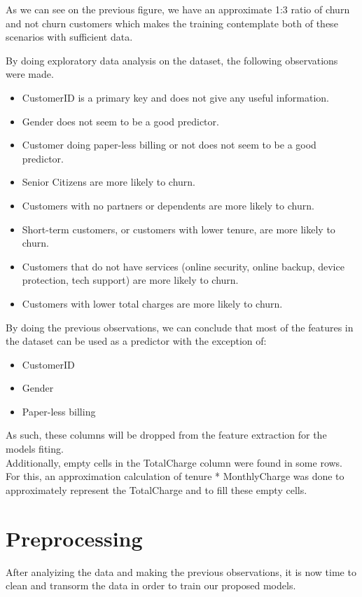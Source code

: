 \documentclass[letterpaper, 10 pt, conference]{ieeeconf}
\begin{document}
As we can see on the previous figure, we have an approximate 1:3 ratio of churn and not churn customers which makes the training
contemplate both of these scenarios with sufficient data.

By doing exploratory data analysis on the dataset, the following observations were made.
\begin{itemize}
    \item CustomerID is a primary key and does not give any useful information.
    \item Gender does not seem to be a good predictor.
    \item Customer doing paper-less billing or not does not seem to be a good predictor.
    \item Senior Citizens are more likely to churn.
    \item Customers with no partners or dependents are more likely to churn.
    \item Short-term customers, or customers with lower tenure, are more likely to churn.
    \item Customers that do not have services (online security, online backup, device protection, tech support) are more likely to churn.
    \item Customers with lower total charges are more likely to churn.
\end{itemize}
By doing the previous observations, we can conclude that most of the features in the dataset can be used as a predictor with the exception of:
\begin{itemize}
    \item CustomerID
    \item Gender
    \item Paper-less billing
\end{itemize}

As such, these columns will be dropped from the feature extraction for the models fiting. \\

Additionally, empty cells in the TotalCharge column were found in some rows. For this, an approximation calculation of tenure * MonthlyCharge was done
to approximately represent the TotalCharge and to fill these empty cells.

\section{ Preprocessing}
After analyizing the data and making the previous observations, it is now time to clean and transorm the data 
in order to train our proposed models. \\
\end{document}
